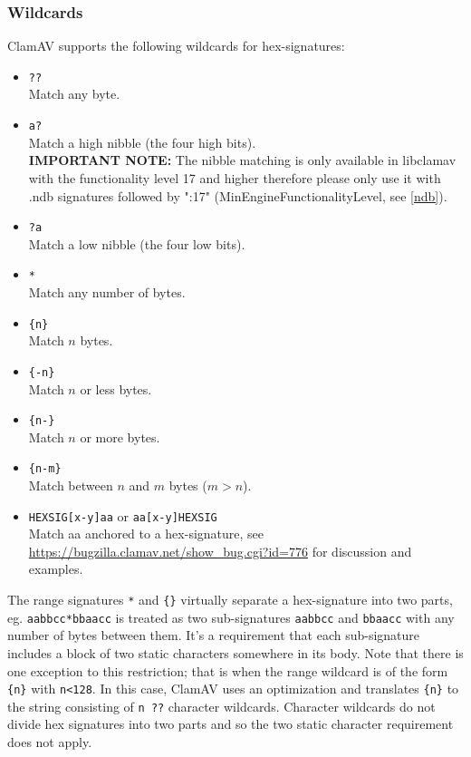 \documentclass[a4paper,titlepage,12pt]{article}
\begin{document}
    \subsubsection{Wildcards}
    ClamAV supports the following wildcards for hex-signatures:
    \begin{itemize}
	\item \verb+??+\\
	Match any byte.
	\item \verb+a?+\\
	Match a high nibble (the four high bits).\\ \textbf{IMPORTANT NOTE:}
	The nibble matching is only available in libclamav with the
	functionality level 17 and higher therefore please only use it with
	.ndb signatures followed by ":17" (MinEngineFunctionalityLevel,
	see \ref{ndb}).
	\item \verb+?a+\\
	Match a low nibble (the four low bits).
	\item \verb+*+\\
	Match any number of bytes.
	\item \verb+{n}+\\
	Match $n$ bytes.
	\item \verb+{-n}+\\
	Match $n$ or less bytes.
	\item \verb+{n-}+\\
	Match $n$ or more bytes.
	\item \verb+{n-m}+\\
	Match between $n$ and $m$ bytes ($m > n$).
	\item \verb+HEXSIG[x-y]aa+ or \verb+aa[x-y]HEXSIG+\\
	Match aa anchored to a hex-signature, see
	\url{https://bugzilla.clamav.net/show_bug.cgi?id=776} for
	discussion and examples.
    \end{itemize}
    The range signatures \verb+*+ and \verb+{}+ virtually separate
    a hex-signature into two parts, eg. \verb+aabbcc*bbaacc+ is treated
    as two sub-signatures \verb+aabbcc+ and \verb+bbaacc+ with any number
    of bytes between them. It's a requirement that each sub-signature
    includes a block of two static characters somewhere in its body.
    Note that there is one exception to this restriction; that is when
    the range wildcard is of the form \verb+{n}+ with \verb+n<128+. In this
    case, ClamAV uses an optimization and translates \verb+{n}+ to the string
    consisting of \verb+n ??+ character wildcards. Character wildcards do not
    divide hex signatures into two parts and so the two static character
    requirement does not apply.
\end{document}
